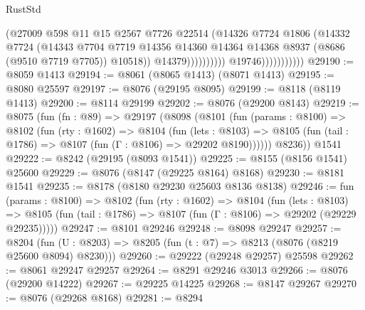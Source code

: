 \begin{lexlean}{RustStd}
\begin{coremodule}
                                          (@27009
                                            @598
                                            @11
                                            @15
                                            @2567
                                            @7726
                                            @22514
                                            (@14326
                                              @7724
                                              @1806
                                              (@14332
                                                @7724
                                                (@14343
                                                  @7704
                                                  @7719
                                                  @14356
                                                  @14360
                                                  @14364
                                                  @14368
                                                  @8937
                                                  (@8686 (@9510 @7719 @7705))
                                                  @10518))
                                              @14379))))))))))
                          @19746)))))))))))
@29190 := @8059 @1413
@29194 := @8061 (@8065 @1413) (@8071 @1413)
@29195 := @8080 @25597
@29197 := @8076 (@29195 @8095)
@29199 := @8118 (@8119 @1413)
@29200 := @8114 @29199
@29202 := @8076 (@29200 @8143)
@29219 := @8075
    (fun (fn : @89) =>
    @29197
      (@8098
        (@8101
          (fun (params : @8100) =>
          @8102
            (fun (rty : @1602) =>
            @8104
              (fun (lets : @8103) =>
              @8105 (fun (tail : @1786) => @8107 (fun (Γ : @8106) => @29202 @8190))))))
        @8236))
    @1541
@29222 := @8242 (@29195 (@8093 @1541))
@29225 := @8155 (@8156 @1541) @25600
@29229 := @8076 (@8147 (@29225 @8164) @8168)
@29230 := @8181 @1541
@29235 := @8178 (@8180 @29230 @25603 @8136 @8138)
@29246 := fun (params : @8100) =>
  @8102
    (fun (rty : @1602) =>
    @8104
      (fun (lets : @8103) =>
      @8105 (fun (tail : @1786) => @8107 (fun (Γ : @8106) => @29202 (@29229 @29235)))))
@29247 := @8101 @29246
@29248 := @8098 @29247
@29257 := @8204
    (fun (U : @8203) => @8205 (fun (t : @7) => @8213 (@8076 (@8219 @25600 @8094) @8230)))
@29260 := @29222 (@29248 @29257) @25598
@29262 := @8061 @29247 @29257
@29264 := @8291 @29246 @3013
@29266 := @8076 (@29200 @14222)
@29267 := @29225 @14225
@29268 := @8147 @29267
@29270 := @8076 (@29268 @8168)
@29281 := @8294

\end{coremodule}
\end{lexlean}

